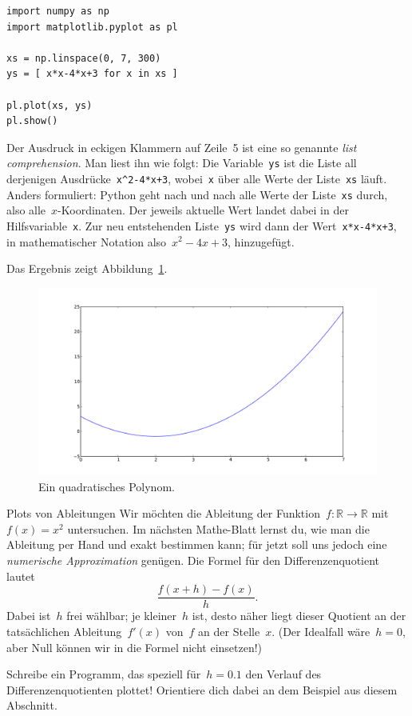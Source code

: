 \documentclass{blatt}
\newcommand{\RR}{\mathbb{R}}
\begin{document}
\begin{verbatim}
import numpy as np
import matplotlib.pyplot as pl

xs = np.linspace(0, 7, 300)
ys = [ x*x-4*x+3 for x in xs ]

pl.plot(xs, ys)
pl.show()
\end{verbatim}

Der Ausdruck in eckigen Klammern auf Zeile~5 ist eine so genannte \emph{list
comprehension}. Man liest ihn wie folgt: Die Variable~\texttt{ys}
ist die Liste all derjenigen Ausdrücke~\texttt{x^2-4*x+3},
wobei~\texttt{x} über alle Werte der Liste~\texttt{xs} läuft.
Anders formuliert: Python geht nach und nach alle Werte der
Liste~\texttt{xs} durch, also alle~$x$-Koordinaten. Der jeweils
aktuelle Wert landet dabei in der Hilfsvariable~\texttt{x}. Zur neu
entstehenden Liste~\texttt{ys} wird dann der
Wert~\texttt{x*x-4*x+3}, in mathematischer Notation
also~$x^2-4x+3$, hinzugefügt.

Das Ergebnis zeigt Abbildung~\ref{fig:polynom}.

\begin{figure}
  \centering
  \includegraphics[scale=0.4]{plot-polynomial}
  \caption{\label{fig:polynom}Ein quadratisches Polynom.}
\end{figure}

\begin{aufgabe}{Plots von Ableitungen}
Wir möchten die Ableitung der Funktion~$f : \RR \to \RR$ mit~$f(x) = x^2$
untersuchen. Im nächsten Mathe-Blatt lernst du, wie man die Ableitung per Hand
und exakt bestimmen kann; für jetzt soll uns jedoch eine \emph{numerische
Approximation} genügen. Die Formel für den Differenzenquotient lautet
\[ \frac{f(x + h) - f(x)}{h}. \]
Dabei ist~$h$ frei wählbar; je kleiner~$h$ ist, desto näher liegt dieser
Quotient an der tatsächlichen Ableitung~$f'(x)$ von~$f$ an der Stelle~$x$. (Der
Idealfall wäre~$h = 0$, aber Null können wir in die Formel nicht einsetzen!)

Schreibe ein Programm, das speziell für~$h = 0.1$ den Verlauf des
Differenzenquotienten plottet! Orientiere dich dabei an dem Beispiel aus diesem
Abschnitt.
\end{aufgabe}
\end{document}
